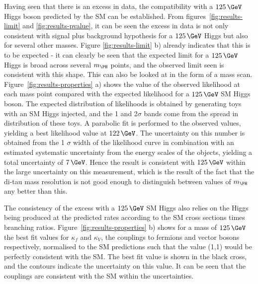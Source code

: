 Having seen that there is an excess in data, the compatibility with a $125\,\GeV$
Higgs boson predicted by the \ac{SM} can be established. From figures~\ref{fig:results-limit} 
and \ref{fig:results-pvalue}, it can be seen the excess
in data is not only consistent with signal plus background hypothesis for a
$125\,\GeV$ Higgs but also for several other masses. Figure
\ref{fig:results-limit} b) already indicates that this is to be expected - it
can clearly be seen that the expected limit for a $125\,\GeV$ Higgs is broad
across several $m_{\PH}$ points, and the observed limit seen is consistent
with this shape. This can also be looked at in the form of a mass scan. Figure~\ref{fig:results-properties} 
a) shows the value of the observed likelihood at
each mass point compared with the expected likelihood for a $125\,\GeV$ \ac{SM}
Higgs boson. The expected distribution of likelihoods is obtained by generating
toys with an \ac{SM} Higgs injected, and the 1 and 2$\sigma$ bands come from the
spread in distribution of these toys. A parabolic fit is performed to the
observed values, yielding a best likelihood value at $122\,\GeV$. The uncertainty
on this number is obtained from the 1 $\sigma$ width of the likelihood curve in
combination with an estimated systematic uncertainty from the energy scales of
the objects, yielding a total uncertainty of $7\,\GeV$. Hence the result is
consistent with $125\,\GeV$ within the large uncertainty on this measurement,
which is the result of the fact that the di-tau mass resolution is not good
enough to distinguish between values of $m_{\PH}$ any better than this.

The consistency of the excess with a $125\,\GeV$ \ac{SM} Higgs also relies on the
Higgs being produced at the predicted rates according to the \ac{SM}
cross sections times branching ratios. Figure~\ref{fig:results-properties} b) shows
for a mass of $125\,\GeV$ the  best fit values for $\kappa_{f}$ and $\kappa_{V}$,
the couplings to fermions and vector bosons respectively, normalised to the
\ac{SM} predictions such that the value (1,1) would be perfectly consistent with
the \ac{SM}. The best fit value is shown in the black cross, and the contours
indicate the uncertainty on this value. It can be seen that the couplings are
consistent with the \ac{SM} within the uncertainties.

